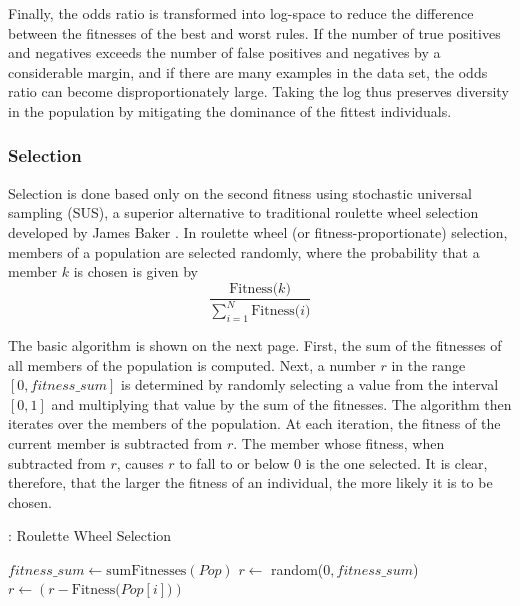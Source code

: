 \documentclass[12pt]{article}
\begin{document}
Finally, the odds ratio is transformed into log-space to reduce the difference between the fitnesses of the best and worst rules. If the number of true positives and negatives exceeds the number of false positives and negatives by a considerable margin, and if there are many examples in the data set, the odds ratio can become disproportionately large. Taking the log thus preserves diversity in the population by mitigating the dominance of the fittest individuals.

\subsubsection{Selection}

Selection is done based only on the second fitness using stochastic universal sampling (SUS), a superior alternative to traditional roulette wheel selection developed by James Baker \cite{j_reducing_1987}. In roulette wheel (or fitness-proportionate) selection, members of a population are selected randomly, where the probability that a member $k$ is chosen is given by
$$ \frac{\text{Fitness($k$)}}{\sum_{i=1}^N\text{Fitness($i$)}}$$

The basic algorithm is shown on the next page. First, the sum of the fitnesses of all members of the population is computed. Next, a number $r$ in the range $[0, fitness\_sum]$ is determined by randomly selecting a value from the interval $[0,1]$ and multiplying that value by the sum of the fitnesses. The algorithm then iterates over the members of the population. At each iteration, the fitness of the current member is subtracted from $r$. The member whose fitness, when subtracted from $r$, causes $r$ to fall to or below 0 is the one selected. It is clear, therefore, that the larger the fitness of an individual, the more likely it is to be chosen.

\begin{algorithm}
\caption{: Roulette Wheel Selection}
\label{rws}
\begin{algorithmic}
\State $fitness\_sum \gets \text{sumFitnesses}(Pop)$
\State $r \gets$ random($0,fitness\_sum$)
\State $r \gets (r - \text{Fitness($Pop[i]$)})$
\State {}
\EndIf
\EndFor
\State {}
\EndFunction
\end{algorithmic}
\end{algorithm}
\end{document}
